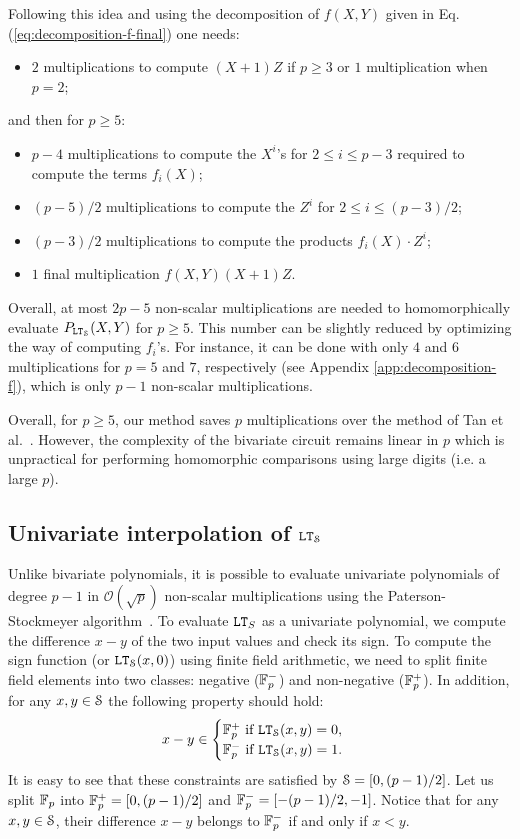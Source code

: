 Following this idea and using the decomposition of $f(X,Y)$ given in Eq. (\ref{eq:decomposition-f-final}) one needs:
\begin{itemize}
\item $2$ multiplications to compute $(X+1)Z$ if $p\geq 3$ or $1$ multiplication when $p=2$;
\end{itemize}
and then for $p\geq 5$:
\begin{itemize}
\item $p-4$ multiplications to compute the $X^i$'s for $2\leq i \leq p-3$ required to compute the terms $f_i(X)$;
\item $(p-5)/2$ multiplications to compute the $Z^i$ for $2\leq i \leq (p-3)/2$;
\item $(p-3)/2$ multiplications to compute the products $f_i(X)\cdot Z^i$;
\item $1$ final multiplication $f(X,Y)(X+1)Z$.
\end{itemize}
Overall, at most $2p-5$ non-scalar multiplications are needed to homomorphically evaluate $P_{\LT_\S}(X,Y)$ for \mbox{$p \geq 5$}. 
This number can be slightly reduced by optimizing the way of computing $f_i$'s. 
For instance, it can be done with only $4$ and $6$ multiplications for $p=5$ and $7$, respectively (see Appendix \ref{app:decomposition-f}), which is only $p-1$ non-scalar multiplications.

Overall, for $p\geq 5$, our method saves $p$ multiplications over the method of Tan et al.~\cite{TLWRK20}. 
However, the complexity of the bivariate circuit remains linear in $p$ which is unpractical for performing homomorphic comparisons using large digits (i.e. a large $p$).
  
\subsection{Univariate interpolation of $\LT_\S$}
Unlike bivariate polynomials, it is possible to evaluate univariate polynomials of degree $p-1$ in $\mathcal{O}(\sqrt{p})$ non-scalar multiplications using the Paterson-Stockmeyer algorithm~\cite{SIAM:PS73}. 
To evaluate $\LT_S$ as a univariate polynomial, we compute the difference $x-y$ of the two input values and check its sign.
To compute the sign function (or $\LT_\S(x,0)$) using finite field arithmetic, we need to split finite field elements into two classes:  negative ($\F_p^-$) and non-negative ($\F_p^+$).
In addition, for any $x, y \in \S$ the following property should hold:
\begin{align*}
  x - y \in 
  \begin{cases}
    \F_p^+ \text{ if } \LT_\S(x,y) = 0, \\
    \F_p^- \text{ if } \LT_\S(x,y) = 1.
  \end{cases}
\end{align*}   
It is easy to see that these constraints are satisfied by $\S = [0, (p-1)/2]$.
Let us split $\F_p$ into $\F_p^+ = [0, (p-1)/2]$ and $\F_p^- = [-(p-1)/2, -1]$.
Notice that for any $x, y \in \S$, their difference $x - y$ belongs to $\F_p^-$ if and only if $x < y$.

